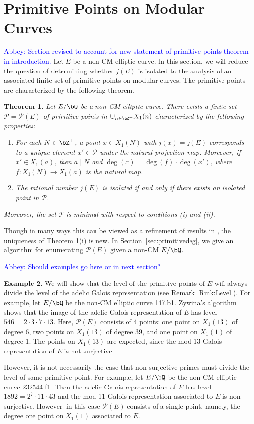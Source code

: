 \documentclass[11pt,reqno]{amsart}
\theoremstyle{plain}
\newtheorem{theorem}{Theorem}%
\theoremstyle{definition}
\newtheorem{example}[theorem]{Example}
\newcommand{\Q}{\bQ}
\newcommand{\Z}{\bZ}
\newcommand{\abbey}[1]{\textcolor{blue}{Abbey: #1}}
\begin{document}
  
\section{Primitive Points on Modular Curves}
\label{sec:PrimitivePoints}

\abbey{Section revised to account for new statement of primitive points theorem in introduction.} Let $E$ be a non-CM elliptic curve. In this section, we will reduce the question of determining whether $j(E)$ is isolated to the analysis of an associated finite set of primitive points on modular curves. The primitive points are characterized by the following theorem.

\begin{theorem}\label{Thm:PrimPts}
Let $E/\Q$ be a non-CM elliptic curve.  There exists a finite set $\mathcal{P}=\mathcal{P}(E)$ of primitive points in $\cup_{n \in \Z^+} X_1(n)$ characterized by the following properties:
\begin{enumerate}
\item For each $N\in \Z^+$, a point $x \in X_1(N)$ with $j(x)=j(E)$ corresponds to a unique element $x' \in \mathcal{P}$ under the natural projection map. Moreover, if $x' \in X_1(a)$, then $a \mid N$ and $\deg(x)=\deg(f)\cdot \deg(x')$, where $f: X_1(N) \rightarrow X_1(a)$ is the natural map.
\item The rational number $j(E)$ is isolated if and only if there exists an isolated point in $\mathcal{P}$.
\end{enumerate}
Moreover, the set $\mathcal{P}$ is minimal with respect to conditions (i) and (ii).
\end{theorem} 

\noindent Though in many ways this can be viewed as a refinement of results in \cite{BELOV}, the uniqueness of Theorem \ref{Thm:PrimPts}(i) is new. In Section~\ref{sec:primitivedeg}, we give an algorithm for enumerating $\mathcal{P}(E)$ given a non-CM $E/\Q$.

\abbey{Should examples go here or in next section?}
\begin{example}
We will show that the level of the primitive points of $E$ will always divide the level of the adelic Galois representation (see Remark \ref{Rmk:Level}). For example, let $E/\Q$ be the non-CM elliptic curve 147.b1. Zywina's algorithm \cite{ZywinaAlgorithm} shows that the image of the adelic Galois representation of $E$ has level $546=2 \cdot 3 \cdot 7 \cdot 13$. Here, $\mathcal{P}(E)$ consists of 4 points: one point on $X_1(13)$ of degree 6, two points on $X_1(13)$ of degree 39, and one point on $X_1(1)$ of degree 1. The points on $X_1(13)$ are expected, since the mod 13 Galois representation of $E$ is not surjective. 

However, it is not necessarily the case that non-surjective primes must divide the level of some primitive point. For example, let $E/\Q$ be the non-CM elliptic curve 232544.f1. Then the adelic Galois representation of $E$ has level $1892=2^2\cdot11 \cdot 43$ and the mod 11 Galois representation associated to $E$ is non-surjective. However, in this case $\mathcal{P}(E)$ consists of a single point, namely, the degree one point on $X_1(1)$ associated to $E$.
\end{example}
\end{document}
